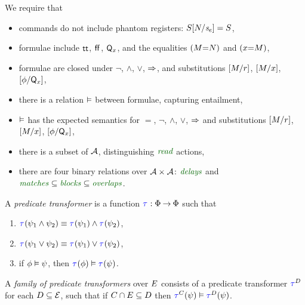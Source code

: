 \begin{scope}
  \noindent
  We require that
  \begin{itemize}
  \item commands do not include phantom registers: $S[N/\mathit{s}_{e}]=S$,
  \item formulae include $\mathsf{tt}$, $\mkern.6mu\mathsf{ff}\mkern.6mu$, $\mathsf{Q}_{x}$, and the equalities $(M{=}N)$ and $(x{=}M)$,
  \item formulae are closed under $\lnot$, $\land$, $\lor$, $\mathbin{\Rightarrow}$, and
    substitutions $[M/r]$, $[M/x]$, $[\phi/\mathsf{Q}_{x}]$,
  \item there is a relation $\mathrel{\vDash}$ between
    formulae, capturing entailment, 
  \item $\mathrel{\vDash}$ has the expected semantics for $=$, $\lnot$,
    $\land$, $\lor$, $\mathbin{\Rightarrow}$ and substitutions $[M/r]$,
    $[M/x]$, $[\phi/\mathsf{Q}_{x}]$,
  \item there is a subset of $\mathcal{A}$, distinguishing
    $\sreaddef$ actions,
  \item there are four binary relations over $\mathcal{A}\times\mathcal{A}$:
    $\rdelaysdef$ and ${\rmatchesdef}\subseteq{\rblocksdef}\subseteq{\roverlapsdef}$.
  \end{itemize}

  \noindent
  \begin{definition}
    \label{def:trans}
    A \emph{predicate transformer} is a function
    $\aTr{}{}:\Formulae\fun\Formulae$ such that
    \begin{enumerate}[,label=(\textsc{x}\arabic*),ref=\textsc{x}\arabic*]
    \item \label{tr-and}
      $\aTr{}{\bForm_1\land\bForm_2}\riff\aTr{}{\bForm_1}\land\aTr{}{\bForm_2}$,    
    \item \label{tr-or}
      $\aTr{}{\bForm_1\lor\bForm_2}\riff\aTr{}{\bForm_1}\lor\aTr{}{\bForm_2}$,
    \item \label{tr-implies}
      if $\phi \mathrel{\vDash} \psi$, then $\aTr{}{\aForm} \rimplies
      \aTr{}{\bForm}$.
    \end{enumerate}
  \end{definition}
  \medskip

  \noindent
  \begin{definition}
    \label{def:family}
    A \emph{family of predicate transformers} over $E$ consists of a
    predicate transformer $\aTr{\bEvs}{}$ for each $D\subseteq\mathcal{E}$,
    such that if $C \cap E \subseteq D$ then $\aTr{\cEvs}{\bForm}
    \rimplies \aTr{\bEvs}{\bForm}$.
  \end{definition}
  \medskip


\end{scope}
